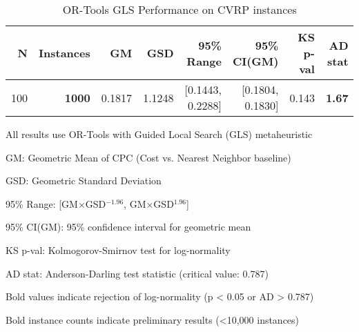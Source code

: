 \begin{table}[htbp]
\centering
\caption{OR-Tools GLS Performance on CVRP instances}
\begin{tabular}{rrrrrrrr}
\toprule
N & Instances & GM & GSD & 95\% Range & 95\% CI(GM) & KS p-val & AD stat \\
\midrule
100 & \textbf{1000} & 0.1817 & 1.1248 & [0.1443, 0.2288] & [0.1804, 0.1830] & 0.143 & \textbf{1.67} \\
\bottomrule
\end{tabular}
\begin{tablenotes}
\small
\item All results use OR-Tools with Guided Local Search (GLS) metaheuristic
\item GM: Geometric Mean of CPC (Cost vs. Nearest Neighbor baseline)
\item GSD: Geometric Standard Deviation
\item 95\% Range: [GM×GSD$^{-1.96}$, GM×GSD$^{1.96}$]
\item 95\% CI(GM): 95\% confidence interval for geometric mean
\item KS p-val: Kolmogorov-Smirnov test for log-normality
\item AD stat: Anderson-Darling test statistic (critical value: 0.787)
\item Bold values indicate rejection of log-normality (p < 0.05 or AD > 0.787)
\item Bold instance counts indicate preliminary results (<10,000 instances)
\end{tablenotes}
\end{table}